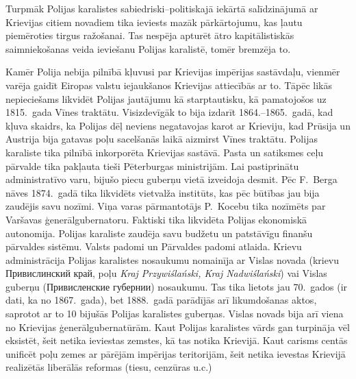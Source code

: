 \documentclass[twoside,a5paper,12pt,fleqn,openany]{extbook}
\newcommand{\pltxti}[1]{\textit{\textpolish{#1}}}
\newcommand{\rutxti}[1]{\textrussian{#1}}
\begin{document}
Turpmāk Polijas karalistes sabiedriski--politiskajā iekārtā salīdzinājumā ar Krievijas citiem novadiem tika ieviests mazāk pārkārtojumu, kas ļautu piemēroties tirgus ražošanai. Tas nespēja apturēt ātro kapitālistiskās saimniekošanas veida ieviešanu Polijas karalistē, tomēr bremzēja to.

Kamēr Polija nebija pilnībā kļuvusi par Krievijas impērijas sastāvdaļu, vienmēr varēja gaidīt Eiropas valstu iejaukšanos Krievijas attiecībās ar to. Tāpēc likās nepieciešams likvidēt Polijas jautājumu kā starptautisku, kā pamatojošos uz 1815.~gada Vīnes traktātu. Visizdevīgāk to bija izdarīt 1864.--1865.~gadā, kad kļuva skaidrs, ka Polijas dēļ neviens negatavojas karot ar Krieviju, kad Prūsija un Austrija bija gatavas poļu sacelšanās laikā aizmirst Vīnes traktātu. Polijas karaliste tika pilnībā inkorporēta Krievijas sastāvā. Pasta un satiksmes ceļu pārvalde tika pakļauta tieši Pēterburgas ministrijām. Lai pastiprinātu administratīvo varu, bijušo piecu guberņu vietā izveidoja desmit. Pēc F.~Berga nāves 1874.~gadā tika likvidēts vietvalža institūts, kas pēc būtības jau bija zaudējis savu nozīmi. Viņa varas pārmantotājs P.~Kocebu tika nozīmēts par Varšavas ģenerālgubernatoru. Faktiski tika likvidēta Polijas ekonomiskā autonomija. Polijas karaliste zaudēja savu budžetu un patstāvīgu finanšu pārvaldes sistēmu. Valsts padomi un Pārvaldes padomi atlaida. Krievu administrācija Polijas karalistes nosaukumu nomainīja ar Vislas novada (krievu \rutxti{Привислинский край}, poļu \pltxti{Kraj Przywiślański, Kraj Nadwiślański}) vai Vislas guberņu (\rutxti{Привисленские губернии}) nosaukumu. Tas tika lietots jau 70.~gados (ir dati, ka no 1867.~gada), bet 1888.~gadā parādījās arī likumdošanas aktos, saprotot ar to 10 bijušās Polijas karalistes guberņas. Vislas novads bija arī viena no Krievijas ģenerālgubernatūrām. Kaut Polijas karalistes vārds gan turpināja vēl eksistēt, šeit netika ieviestas zemstes, kā tas notika Krievijā. Kaut carisms centās unificēt poļu zemes ar pārējām impērijas teritorijām, šeit netika ievestas Krievijā realizētās liberālās reformas (tiesu, cenzūras u.c.)
\end{document}

